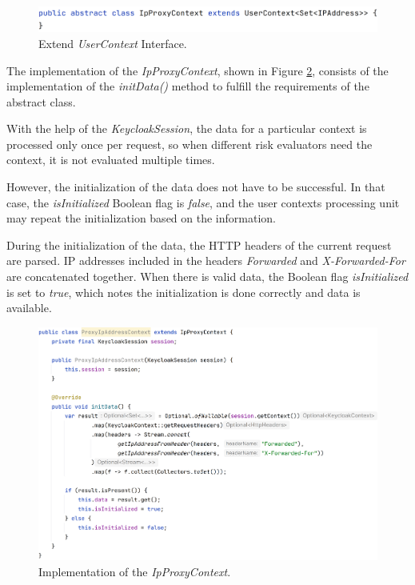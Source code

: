 \begin{figure}[htbp]
  \centering
  \includegraphics[width=1\textwidth]{img/sections/6-implementation/proxyIpAddressContextInterface.png}
  \caption{Extend \textit{UserContext} Interface.}
  \label{fig:impl-user-ctx-ifc}
\end{figure}

The implementation of the \textit{IpProxyContext}, shown in Figure \ref{fig:impl-user-ctx-ip}, consists of the implementation of the \textit{initData()} method to fulfill the requirements of the abstract class.

With the help of the \textit{KeycloakSession}, the data for a particular context is processed only once per request, so when different risk evaluators need the context, it is not evaluated multiple times.

However, the initialization of the data does not have to be successful.
In that case, the \textit{isInitialized} Boolean flag is \textit{false}, and the user contexts processing unit may repeat the initialization based on the information.

During the initialization of the data, the HTTP headers of the current request are parsed.
IP addresses included in the headers \textit{Forwarded} and \textit{X-Forwarded-For} are concatenated together.
When there is valid data, the Boolean flag \textit{isInitialized} is set to \textit{true}, which notes the initialization is done correctly and data is available. 

\begin{figure}[htbp]
  \centering
  \includegraphics[width=1\textwidth]{img/sections/6-implementation/proxyIpAddress-full.png}
  \caption{Implementation of the \textit{IpProxyContext}.}
  \label{fig:impl-user-ctx-ip}
\end{figure}

